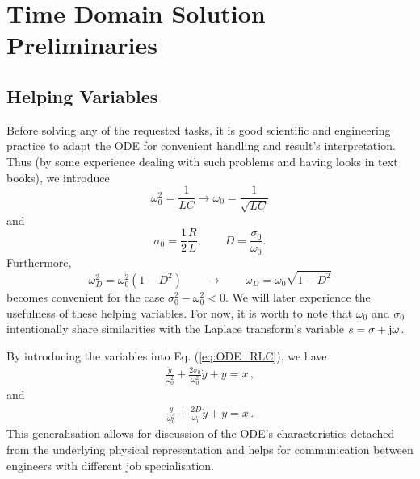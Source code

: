 \documentclass[a4paper,11pt,oneside]{scrartcl}
\newcommand{\eq}[1]{Eq. (\ref{#1})}
\begin{document}
\section{Time Domain Solution Preliminaries}

\subsection{Helping Variables}
Before solving any of the requested tasks, it is good scientific and engineering
practice to adapt the ODE for convenient handling and result's interpretation.
Thus (by some experience dealing with such problems and having looks
in text books), we introduce
\begin{equation}
\omega_0^2 = \frac{1}{L C} \rightarrow \omega_0 = \frac{1}{\sqrt{L C}}
\end{equation}
and
\begin{equation}
\sigma_0 = \frac{1}{2}\frac{R}{L},
\qquad
D = \frac{\sigma_0}{\omega_0}.
\end{equation}
%
Furthermore,
\begin{equation}
\omega_D^2 = \omega_0^2 (1-D^2) \qquad \rightarrow \qquad \omega_D = \omega_0
\sqrt{1-D^2}
\end{equation}
becomes convenient for the case $\sigma_0^2 - \omega_0^2 < 0$.
We will later experience the usefulness of these helping variables.
For now, it is worth to note that $\omega_0$ and $\sigma_0$ intentionally share
similarities with the Laplace transform's variable $s=\sigma + \im \omega$.

By introducing the variables into \eq{eq:ODE_RLC}, we have
\begin{align}
\label{eq:ODE_sigma0}
\boxed{
\frac{\ddot{y}}{\omega_0^2} + \frac{2 \sigma_0}{\omega_0^2} \dot{y} + y = x
}\,,
\end{align}
and
\begin{align}
\label{eq:ODE_D}
\boxed{
\frac{\ddot{y}}{\omega_0^2} + \frac{2 D}{\omega_0} \dot{y} + y = x}\,.
\end{align}
This generalisation allows for discussion of the ODE's characteristics detached
from the underlying physical representation and helps for communication between
engineers with different job specialisation.


\end{document}
